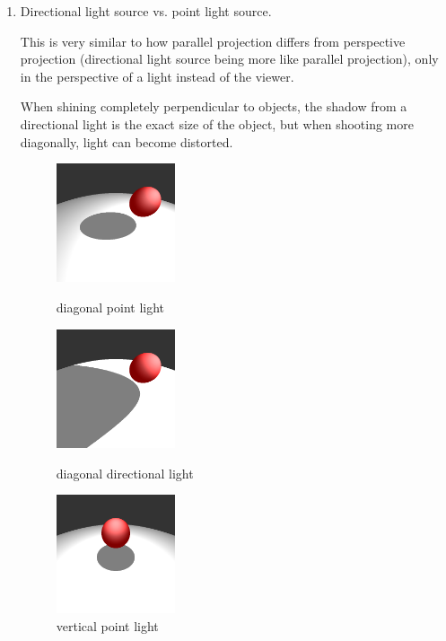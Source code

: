 \documentclass{assignment}
\begin{document}
\begin{enumerate}
 \item Directional light source vs. point light source.

       This is very similar to how parallel projection differs from perspective projection (directional light source being more like parallel projection), only in the perspective of a light instead of the viewer.

       When shining completely perpendicular to objects, the shadow from a directional light is the exact size of the object, but when shooting more diagonally, light can become distorted.

       \begin{figure}[H]
        \centering
        \begin{minipage}[c]{0.23\linewidth}
         \centering
         \includegraphics[width=3.5cm]{img/point_diag_light.png}
         \caption{\small{diagonal point light}}
        \end{minipage}
        \begin{minipage}[c]{0.23\linewidth}
         \centering
         \includegraphics[width=3.5cm]{img/dir_diag_light.png}
         \caption{\small{diagonal directional light}}
        \end{minipage}
        \begin{minipage}[c]{0.23\linewidth}
         \centering
         \includegraphics[width=3.5cm]{img/point_vert_light.png}
         \caption{\small{vertical point light}}

\end{minipage}
\end{figure}
\end{enumerate}
\end{document}
